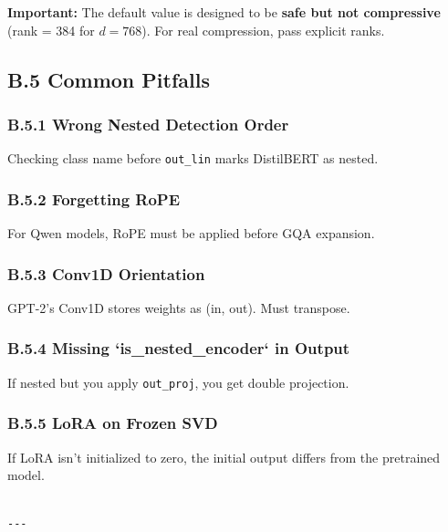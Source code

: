 \textbf{Important:} The default value is designed to be \textbf{safe but not compressive} 
(rank = 384 for $d=768$). For real compression, pass explicit ranks.

\subsection{B.5 Common Pitfalls}

\subsubsection{B.5.1 Wrong Nested Detection Order}

Checking class name before \texttt{out\_lin} marks DistilBERT as nested.

\subsubsection{B.5.2 Forgetting RoPE}

For Qwen models, RoPE must be applied before GQA expansion.

\subsubsection{B.5.3 Conv1D Orientation}

GPT-2's Conv1D stores weights as (in, out). Must transpose.

\subsubsection{B.5.4 Missing `is\_nested\_encoder` in Output}

If nested but you apply \texttt{out\_proj}, you get double projection.

\subsubsection{B.5.5 LoRA on Frozen SVD}

If LoRA isn't initialized to zero, the initial output differs from the 
pretrained model.
\begin{lstlisting}

---
\end{lstlisting}